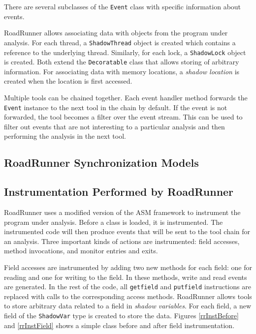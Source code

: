 There are several subclasses of the \texttt{Event} class with specific
information about events.

RoadRunner allows associating data with objects from the program under analysis.
For each thread, a \texttt{ShadowThread} object is created which contains a
reference to the underlying thread. Similarly, for each lock, a
\texttt{ShadowLock} object is created. Both extend the \texttt{Decoratable}
class that allows storing of arbitrary information. For associating data with
memory locations, a \emph{shadow location} is created when the location is first
accessed.

Multiple tools can be chained together. Each event handler method forwards the
\texttt{Event} instance to the next tool in the chain by default. If the event
is not forwarded, the tool becomes a filter over the event stream. This can be
used to filter out events that are not interesting to a particular analysis and
then performing the analysis in the next tool.

\subsection{RoadRunner Synchronization Models}
{\color{blue}\lipsum[1]}

\subsection{Instrumentation Performed by RoadRunner}

RoadRunner uses a modified version of the ASM framework to instrument the
program under analysis. Before a class is loaded, it is instrumented. The
instrumented code will then produce events that will be sent to the tool chain
for an analysis. Three important kinds of actions are instrumented: field
accesses, method invocations, and monitor entries and exits.

Field accesses are instrumented by adding two new methods for each field: one
for reading and one for writing to the field. In these methods, write and read
events are generated. In the rest of the code, all \texttt{getfield} and
\texttt{putfield} instructions are replaced with calls to the corresponding
access methods. RoadRunner allows tools to store arbitrary data related to a
field in \emph{shadow variables}. For each field, a new field of the
\texttt{ShadowVar} type is created to store the data. Figures \ref{rrInstBefore}
and \ref{rrInstField} shows a simple class before and after field
instrumentation.


